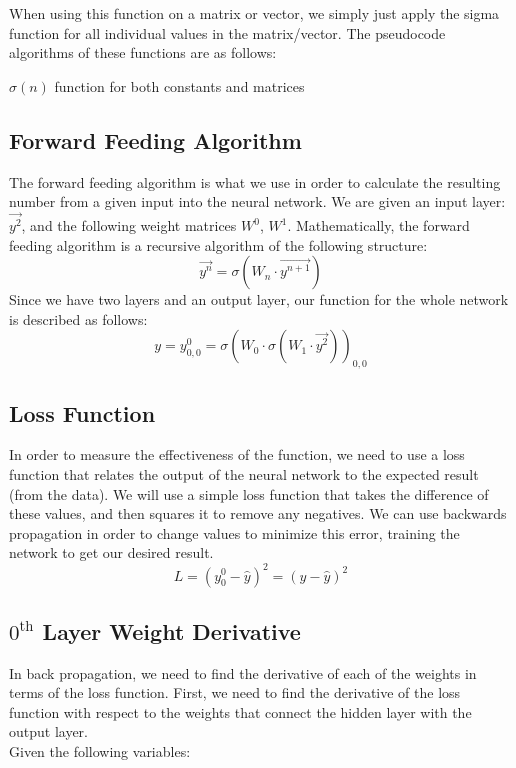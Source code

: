 \documentclass[10pt]{article}
\begin{document}
When using this function on a matrix or vector, we simply just apply the sigma function for all individual values in the matrix/vector. The pseudocode algorithms of these functions are as follows:

\begin{algorithm}[H]
    \caption{$\sigma(n)$ function for both constants and matrices}
\end{algorithm}

\subsection{Forward Feeding Algorithm}
The forward feeding algorithm is what we use in order to calculate the resulting number from a given input into the neural network. We are given an input layer: $\vec{y^2}$, and the following weight matrices $W^0$, $W^1$. Mathematically, the forward feeding algorithm is a recursive algorithm of the following structure:
$$\vec{y^n} = \sigma(W_{n} \cdot \vec{y^{n+1}})$$
Since we have two layers and an output layer, our function for the whole network is described as follows:
$$y = y^0_{0,0} = \sigma(W_0 \cdot \sigma(W_1 \cdot \vec{y^2}))_{0,0}$$
\subsection{Loss Function}
In order to measure the effectiveness of the function, we need to use a loss function that relates the output of the neural network to the expected result (from the data). We will use a simple loss function that takes the difference of these values, and then squares it to remove any negatives. We can use backwards propagation in order to change values to minimize this error, training the network to get our desired result.
$$L = (y^0_0 - \hat{y})^2 = (y - \hat{y})^2$$

\subsection{$0^{\text{th}}$ Layer Weight Derivative}
In back propagation, we need to find the derivative of each of the weights in terms of the loss function. First, we need to find the derivative of the loss function with respect to the weights that connect the hidden layer with the output layer.\\
Given the following variables:
\end{document}
